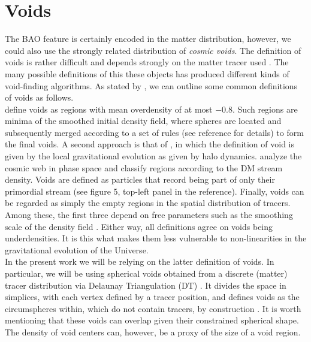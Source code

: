 \documentclass[fleqn, usenatbib]{mnras}
\begin{document}
\section{Voids}
\label{sec:voids}
The BAO feature is certainly encoded in the matter distribution, however, we could also use the strongly related distribution of \textit{cosmic voids}. The definition of voids is rather difficult and depends strongly on the matter tracer used \citep{VandeWeygaert2009}. The many possible definitions of this these objects has produced different kinds of void-finding algorithms. As stated by \citet{Zhao2016}, we can outline some common definitions of voids as follows.\\ \citet{Colberg2005} define voids as regions with mean overdensity of at most $-0.8$. Such regions are minima of the smoothed initial density field, where spheres are located and subsequently merged according to a set of rules (see reference for details) to form the final voids. A second approach is that of \citet{Hahn2007, Forero-Romero2009}, in which the definition of void is given by the local gravitational evolution as given by halo dynamics. \citet{Abel2012} analyze the cosmic web in phase space and classify regions according to the DM stream density. Voids are defined as particles that record being part of only their primordial stream (see figure 5, top-left panel in the reference). Finally, voids can be regarded as simply the empty regions in the spatial distribution of tracers. Among these, the first three depend on free parameters such as the smoothing scale of the density field \citep{Hahn2007}. Either way, all definitions agree on voids being underdensities. It is this what makes them less vulnerable to non-linearities in the gravitational evolution of the Universe.\\
In the present work we will be relying on the latter definition of voids. In particular, we will be using spherical voids obtained from a discrete (matter) tracer distribution via Delaunay Triangulation (DT) \citep{Delaunay1934}. It divides the space in simplices, with each vertex defined by a tracer position, and defines voids as the circumspheres within, which do not contain tracers, by construction \citep{Zhao2016}. It is worth mentioning that these voids can overlap given their constrained spherical shape. The density of void centers can, however, be a proxy of the size of a void region.\\
\end{document}
